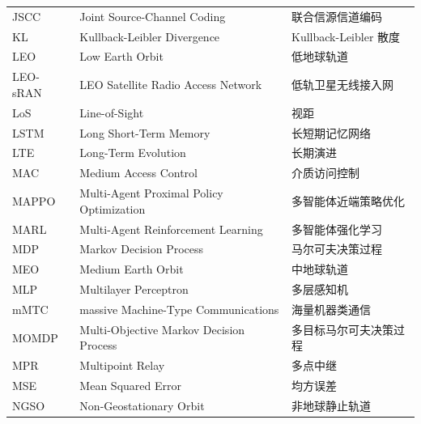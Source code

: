 \begin{abbreviation}
\begin{longtable}{@{} p{} p{} p{} @{}}
  JSCC      & Joint Source-Channel Coding                                     & 联合信源信道编码              \\
  KL        & Kullback-Leibler Divergence                                     & Kullback-Leibler 散度         \\
  LEO       & Low Earth Orbit                                                 & 低地球轨道                    \\
  LEO-sRAN  & LEO Satellite Radio Access Network                              & 低轨卫星无线接入网            \\
  LoS       & Line-of-Sight                                                   & 视距                          \\
  LSTM      & Long Short-Term Memory                                          & 长短期记忆网络                \\
  LTE       & Long-Term Evolution                                             & 长期演进                      \\
  MAC       & Medium Access Control                                           & 介质访问控制                  \\
  MAPPO     & Multi-Agent Proximal Policy Optimization                       & 多智能体近端策略优化          \\
  MARL      & Multi-Agent Reinforcement Learning                             & 多智能体强化学习              \\
  MDP       & Markov Decision Process                                        & 马尔可夫决策过程              \\
  MEO       & Medium Earth Orbit                                              & 中地球轨道                    \\
  MLP       & Multilayer Perceptron                                          & 多层感知机                    \\
  mMTC      & massive Machine-Type Communications                            & 海量机器类通信                \\
  MOMDP     & Multi-Objective Markov Decision Process                        & 多目标马尔可夫决策过程        \\
  MPR       & Multipoint Relay                                                & 多点中继                      \\
  MSE       & Mean Squared Error                                              & 均方误差                      \\
  NGSO      & Non-Geostationary Orbit                                         & 非地球静止轨道                \\

\end{longtable}
\end{abbreviation}
